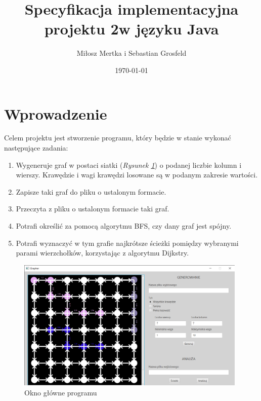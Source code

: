 \documentclass{article}
\title{Specyfikacja implementacyjna projektu 2\linebreak w języku Java}
\author{Miłosz Mertka i Sebastian Grosfeld}
\date{\today}
\begin{document}
\maketitle

\tableofcontents

\newpage

\setlength{\headheight}{23pt}

\section{Wprowadzenie}

Celem projektu jest stworzenie programu, który będzie w stanie wykonać następujące zadania:
\begin{enumerate}
    \item Wygeneruje graf w postaci siatki (\emph{Rysunek \ref{fig:wagi}}) o podanej liczbie kolumn i wierszy. Krawędzie i wagi krawędzi losowane są w podanym zakresie wartości.
    \item Zapisze taki graf do pliku o ustalonym formacie.
    \item Przeczyta z pliku o ustalonym formacie taki graf.
    \item Potrafi określić za pomocą algorytmu BFS, czy dany graf jest spójny.
    \item Potrafi wyznaczyć w tym grafie najkrótsze ścieżki pomiędzy wybranymi parami wierzchołków, korzystając z algorytmu Dijkstry.
\end{enumerate}
\begin{figure}[htp]
        \centering
        \includegraphics[width=11cm]{Images/MainScene.png}
        \caption{Okno główne programu}
        \label{fig:wagi}
\end{figure}
\end{document}
